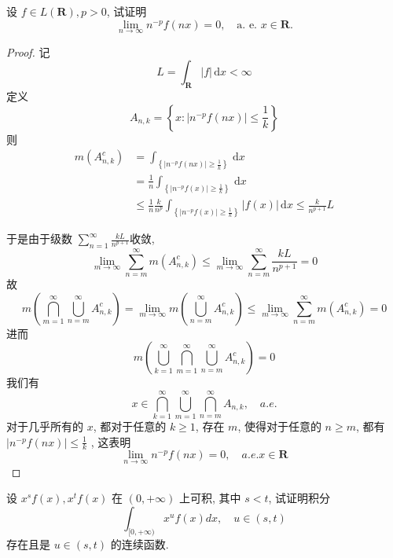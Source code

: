 \documentclass[../main.tex]{subfiles}
\begin{document}
\begin{exercise}{}{}
设 $f \in L(\mathbf{R}), p>0$, 试证明
\[
\lim_{n \to \infty} n^{-p} f(nx) = 0, \quad \text{a. e. } x \in \mathbf{R}.
\]
\end{exercise}
\begin{proof}
   记 \[
   L= \int_{\mathbf{R}}\left| f \right|\,\mathrm{d} x< \infty 
   \] 定义 \[
    A_{n,k}= \left\{ x: \left| n^{-p}f\left( nx \right) \right|  \le  \frac{1 }{k }  \right\}
    \]则 
   \begin{equation}
    \begin{aligned}
        m\left( A_{n,k}^{c} \right)&= \int_{\left\{ \left| n^{-p}f\left( nx \right)  \right|\ge \frac{1 }{k }   \right\}} \,\mathrm{d} x\\ 
         &=  \frac{1 }{n } \int_{\left\{ \left| n^{-p}f\left( x \right)  \right|\ge \frac{1 }{k }   \right\}}\,\mathrm{d} x\\ 
          &\le   \frac{1 }{n }  \frac{k }{n^{p} } \int _{\left\{ \left| n^{-p}f\left( x \right)  \right|\ge  \frac{1 }{k }   \right\}}  \left| f\left( x \right)  \right|\,\mathrm{d} x\le   \frac{k }{n^{p+ 1} }L  
    \end{aligned}
   \end{equation}
   
于是由于级数 \(  \sum _{n = 1}^{\infty}\frac{kL }{n^{p+ 1} }   \)收敛,   \[
\lim_{m\to \infty}\sum _{n = m}^{\infty}m\left( A_{n,k}^{c} \right)\le \lim_{m\to \infty}\sum _{n = m}^{\infty}\frac{kL }{n^{p+ 1} }= 0  
\]故 \[
m\left( \bigcap _{m = 1}^{\infty}\bigcup _{n = m}^{\infty}A_{n,k}^{c} \right)= \lim_{m \to \infty}m\left( \bigcup _{n = m}^{\infty}A_{n,k}^{c} \right)  \le \lim_{m\to \infty}\sum _{n = m}^{\infty}m\left( A_{n,k}^{c} \right)= 0 
\]进而 \[
m\left( \bigcup _{k = 1}^{\infty}\bigcap _{m = 1}^{\infty}\bigcup _{n = m}^{\infty}A_{n,k}^{c} \right)= 0 
\]我们有 \[
x\in \bigcap _{k = 1}^{\infty}\bigcup _{m = 1}^{\infty}\bigcap _{n = m}^{\infty}A_{n,k},\quad a.e.
\]对于几乎所有的 \(  x  \), 都对于任意的 \(  k\ge 1  \), 存在 \(  m  \), 使得对于任意的 \(  n\ge m  \), 都有 \(  \left| n^{-p}f\left( nx \right)  \right|\le \frac{1 }{k }    \)    , 这表明  \[
\lim_{n\to \infty}n^{-p}f\left( nx \right)= 0,\quad a.e. x \in \mathbf{R} 
\]
\end{proof}
\begin{exercise}{}{}
设 $x^s f(x), x^t f(x)$ 在 $(0, +\infty)$ 上可积, 其中 $s<t$, 试证明积分
\[
\int_{[0, +\infty)} x^u f(x) dx, \quad u \in (s, t)
\]
存在且是 $u \in (s, t)$ 的连续函数.
\end{exercise}
\end{document}

